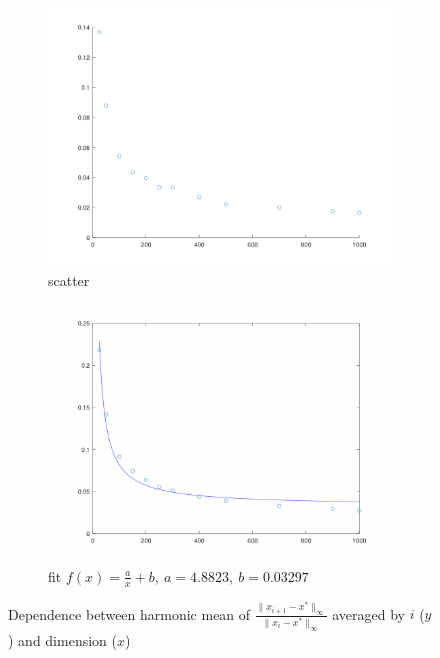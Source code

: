 \documentclass{article}
\begin{document}
\begin{figure}[H]
\centering
\begin{subfigure}{.5\textwidth}
  \centering
  \includegraphics[width=.8\linewidth]{av_harmonic_by_dim.png}
  \caption{scatter}
  \label{fig:sub1}
\end{subfigure}%
\begin{subfigure}{.5\textwidth}
  \centering
  \includegraphics[width=.8\linewidth]{fit_hiperbola_4_8823_0_03297.png}
  \caption{fit \(f(x) = \frac{a}{x} + b,\ a = 4.8823,\ b = 0.03297\)}
  \label{fig:sub2}
\end{subfigure}
\caption{Dependence between harmonic mean of \(\frac{\|x_{i+1} - x^*\|_{\infty}}{\|x_i - x^*\|_{\infty}}\) averaged by \(i\) (\(y\)) and dimension (\(x\))}
\label{fig:test}
\end{figure}


\newpage
\end{document}
